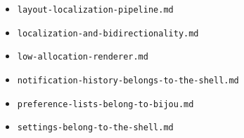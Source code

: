 \begin{itemize}
\item
  \texttt{l\allowbreak{}a\allowbreak{}y\allowbreak{}o\allowbreak{}u\allowbreak{}t\allowbreak{}-\allowbreak{}l\allowbreak{}o\allowbreak{}c\allowbreak{}a\allowbreak{}l\allowbreak{}i\allowbreak{}z\allowbreak{}a\allowbreak{}t\allowbreak{}i\allowbreak{}o\allowbreak{}n\allowbreak{}-\allowbreak{}p\allowbreak{}i\allowbreak{}p\allowbreak{}e\allowbreak{}l\allowbreak{}i\allowbreak{}n\allowbreak{}e\allowbreak{}.\allowbreak{}m\allowbreak{}d}
\item
  \texttt{l\allowbreak{}o\allowbreak{}c\allowbreak{}a\allowbreak{}l\allowbreak{}i\allowbreak{}z\allowbreak{}a\allowbreak{}t\allowbreak{}i\allowbreak{}o\allowbreak{}n\allowbreak{}-\allowbreak{}a\allowbreak{}n\allowbreak{}d\allowbreak{}-\allowbreak{}b\allowbreak{}i\allowbreak{}d\allowbreak{}i\allowbreak{}r\allowbreak{}e\allowbreak{}c\allowbreak{}t\allowbreak{}i\allowbreak{}o\allowbreak{}n\allowbreak{}a\allowbreak{}l\allowbreak{}i\allowbreak{}t\allowbreak{}y\allowbreak{}.\allowbreak{}m\allowbreak{}d}
\item
  \texttt{l\allowbreak{}o\allowbreak{}w\allowbreak{}-\allowbreak{}a\allowbreak{}l\allowbreak{}l\allowbreak{}o\allowbreak{}c\allowbreak{}a\allowbreak{}t\allowbreak{}i\allowbreak{}o\allowbreak{}n\allowbreak{}-\allowbreak{}r\allowbreak{}e\allowbreak{}n\allowbreak{}d\allowbreak{}e\allowbreak{}r\allowbreak{}e\allowbreak{}r\allowbreak{}.\allowbreak{}m\allowbreak{}d}
\item
  \texttt{n\allowbreak{}o\allowbreak{}t\allowbreak{}i\allowbreak{}f\allowbreak{}i\allowbreak{}c\allowbreak{}a\allowbreak{}t\allowbreak{}i\allowbreak{}o\allowbreak{}n\allowbreak{}-\allowbreak{}h\allowbreak{}i\allowbreak{}s\allowbreak{}t\allowbreak{}o\allowbreak{}r\allowbreak{}y\allowbreak{}-\allowbreak{}b\allowbreak{}e\allowbreak{}l\allowbreak{}o\allowbreak{}n\allowbreak{}g\allowbreak{}s\allowbreak{}-\allowbreak{}t\allowbreak{}o\allowbreak{}-\allowbreak{}t\allowbreak{}h\allowbreak{}e\allowbreak{}-\allowbreak{}s\allowbreak{}h\allowbreak{}e\allowbreak{}l\allowbreak{}l\allowbreak{}.\allowbreak{}m\allowbreak{}d}
\item
  \texttt{p\allowbreak{}r\allowbreak{}e\allowbreak{}f\allowbreak{}e\allowbreak{}r\allowbreak{}e\allowbreak{}n\allowbreak{}c\allowbreak{}e\allowbreak{}-\allowbreak{}l\allowbreak{}i\allowbreak{}s\allowbreak{}t\allowbreak{}s\allowbreak{}-\allowbreak{}b\allowbreak{}e\allowbreak{}l\allowbreak{}o\allowbreak{}n\allowbreak{}g\allowbreak{}-\allowbreak{}t\allowbreak{}o\allowbreak{}-\allowbreak{}b\allowbreak{}i\allowbreak{}j\allowbreak{}o\allowbreak{}u\allowbreak{}.\allowbreak{}m\allowbreak{}d}
\item
  \texttt{s\allowbreak{}e\allowbreak{}t\allowbreak{}t\allowbreak{}i\allowbreak{}n\allowbreak{}g\allowbreak{}s\allowbreak{}-\allowbreak{}b\allowbreak{}e\allowbreak{}l\allowbreak{}o\allowbreak{}n\allowbreak{}g\allowbreak{}-\allowbreak{}t\allowbreak{}o\allowbreak{}-\allowbreak{}t\allowbreak{}h\allowbreak{}e\allowbreak{}-\allowbreak{}s\allowbreak{}h\allowbreak{}e\allowbreak{}l\allowbreak{}l\allowbreak{}.\allowbreak{}m\allowbreak{}d}
\end{itemize}

